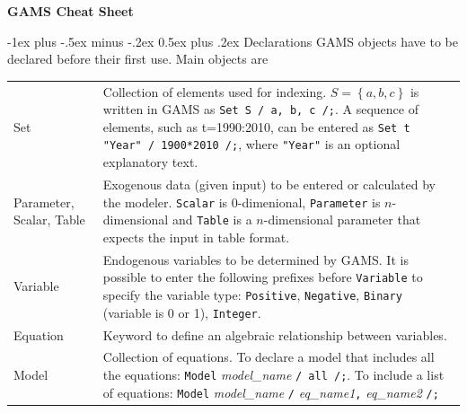 \documentclass[10pt,landscape,a4paper]{article}
\makeatletter
\renewcommand{\section}{\@startsection{section}{1}{0mm}%
                                {-1ex plus -.5ex minus -.2ex}%
                                {0.5ex plus .2ex}%
                                {\color{blue}\normalfont\large\bfseries}}
\makeatother
\begin{document}
\raggedright
\footnotesize
\begin{multicols}{2}


\setlength{\premulticols}{1pt}
\setlength{\postmulticols}{1pt}
\setlength{\multicolsep}{1pt}
\setlength{\columnsep}{2pt}

\begin{center}
     \Large{\textbf{GAMS Cheat Sheet}} \\
\end{center}

\section{Declarations}
GAMS objects have to be declared before their first use. Main objects are\\
\begin{tabularx}{\columnwidth}{@{}>{\ttfamily}l>{\raggedright\arraybackslash}X@{}}
  Set & Collection of elements used for indexing. $S=\left\{a,b,c\right\}$ is
  written in GAMS as \texttt{Set S / a, b, c /;}. A sequence of elements, such
  as t=1990:2010, can be entered as \texttt{Set t "Year" / 1900*2010 /;}, where
  \texttt{"Year"} is an optional
  explanatory text.\\
  Parameter\textrm{, }Scalar\textrm{, }Table & Exogenous data (given input) to
  be entered or calculated by the modeler. \texttt{Scalar} is 0-dimenional,
  \texttt{Parameter} is $n$-dimensional and \texttt{Table} is a $n$-dimensional parameter
  that expects the input in table format.
  \\
  Variable & Endogenous variables to be determined by GAMS. It is possible to
  enter the following prefixes before \texttt{Variable} to specify the variable
  type:
  \texttt{Positive}, \texttt{Negative}, \texttt{Binary} (variable is 0 or 1), \texttt{Integer}.\\
  Equation   & Keyword to define an algebraic relationship between variables. \\
  Model & Collection of equations. To declare a model that includes all the
  equations:\linebreak{} \texttt{Model} \emph{model\_name} \texttt{/ all
    /;}. \linebreak{}To include a list of equations:\linebreak{} \texttt{Model}
  \emph{model\_name} \texttt{/} \emph{eq\_name1}\texttt{,} \emph{eq\_name2}
  \texttt{/;}
\end{tabularx}


\end{multicols}
\end{document}
